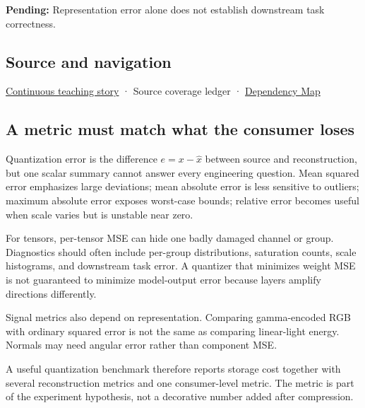 \textbf{Pending:} Representation error alone does not establish downstream task correctness.

\subsection{Source and navigation}\label{appendix-537171d69d27-source-and-navigation}

\hyperref[01-foundations-i-ch001-choosing-what-information-to-keep]{Continuous teaching story} · {Source coverage ledger} · \hyperref[appendix-4ad47bdd269a]{Dependency Map}

\subsection{A metric must match what the consumer loses}\label{appendix-537171d69d27-a-metric-must-match-what-the-consumer-loses}

Quantization error is the difference \(e=x-\hat x\) between source and reconstruction, but one scalar summary cannot answer every engineering question. Mean squared error emphasizes large deviations; mean absolute error is less sensitive to outliers; maximum absolute error exposes worst-case bounds; relative error becomes useful when scale varies but is unstable near zero.

For tensors, per-tensor MSE can hide one badly damaged channel or group. Diagnostics should often include per-group distributions, saturation counts, scale histograms, and downstream task error. A quantizer that minimizes weight MSE is not guaranteed to minimize model-output error because layers amplify directions differently.

Signal metrics also depend on representation. Comparing gamma-encoded RGB with ordinary squared error is not the same as comparing linear-light energy. Normals may need angular error rather than component MSE.

A useful quantization benchmark therefore reports storage cost together with several reconstruction metrics and one consumer-level metric. The metric is part of the experiment hypothesis, not a decorative number added after compression.
